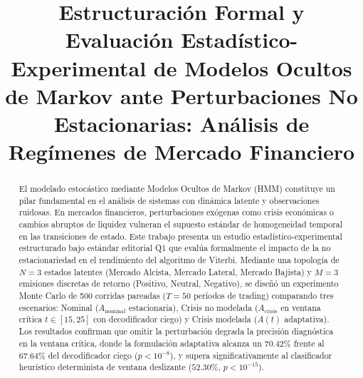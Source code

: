 \documentclass[conference,10pt,twocolumn]{IEEEtran}
\begin{document}
\title{Estructuración Formal y Evaluación Estadístico-Experimental de Modelos Ocultos de Markov ante Perturbaciones No Estacionarias: Análisis de Regímenes de Mercado Financiero}

\author{
}

\maketitle

\begin{abstract}
El modelado estocástico mediante Modelos Ocultos de Markov (HMM) constituye un pilar fundamental en el análisis de sistemas con dinámica latente y observaciones ruidosas. En mercados financieros, perturbaciones exógenas como crisis económicas o cambios abruptos de liquidez vulneran el supuesto estándar de homogeneidad temporal en las transiciones de estado. Este trabajo presenta un estudio estadístico-experimental estructurado bajo estándar editorial Q1 que evalúa formalmente el impacto de la no estacionariedad en el rendimiento del algoritmo de Viterbi. Mediante una topología de $N=3$ estados latentes (Mercado Alcista, Mercado Lateral, Mercado Bajista) y $M=3$ emisiones discretas de retorno (Positivo, Neutral, Negativo), se diseñó un experimento Monte Carlo de 500 corridas pareadas ($T=50$ períodos de trading) comparando tres escenarios: Nominal ($A_{\text{nominal}}$ estacionaria), Crisis no modelada ($A_{\text{crisis}}$ en ventana crítica $t \in [15, 25]$ con decodificador ciego) y Crisis modelada ($A(t)$ adaptativa). Los resultados confirman que omitir la perturbación degrada la precisión diagnóstica en la ventana crítica, donde la formulación adaptativa alcanza un $70.42\%$ frente al $67.64\%$ del decodificador ciego ($p < 10^{-8}$), y supera significativamente al clasificador heurístico determinista de ventana deslizante ($52.30\%$, $p < 10^{-15}$).
\end{abstract}
\end{document}
